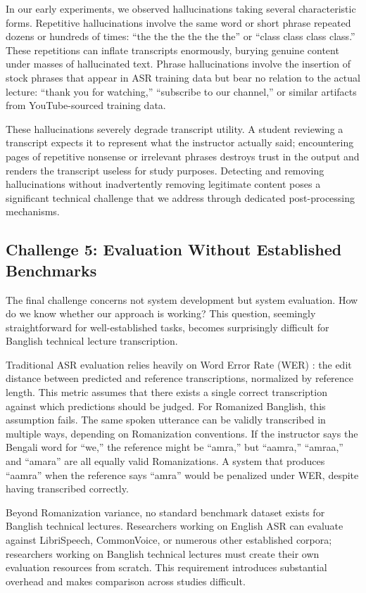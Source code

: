 In our early experiments, we observed hallucinations taking several characteristic forms. Repetitive hallucinations involve the same word or short phrase repeated dozens or hundreds of times: ``the the the the the the'' or ``class class class class.'' These repetitions can inflate transcripts enormously, burying genuine content under masses of hallucinated text. Phrase hallucinations involve the insertion of stock phrases that appear in ASR training data but bear no relation to the actual lecture: ``thank you for watching,'' ``subscribe to our channel,'' or similar artifacts from YouTube-sourced training data.

These hallucinations severely degrade transcript utility. A student reviewing a transcript expects it to represent what the instructor actually said; encountering pages of repetitive nonsense or irrelevant phrases destroys trust in the output and renders the transcript useless for study purposes. Detecting and removing hallucinations without inadvertently removing legitimate content poses a significant technical challenge that we address through dedicated post-processing mechanisms.

\subsection{Challenge 5: Evaluation Without Established Benchmarks}

The final challenge concerns not system development but system evaluation. How do we know whether our approach is working? This question, seemingly straightforward for well-established tasks, becomes surprisingly difficult for Banglish technical lecture transcription.

Traditional ASR evaluation relies heavily on Word Error Rate (WER) \cite{Jurafsky2000}: the edit distance between predicted and reference transcriptions, normalized by reference length. This metric assumes that there exists a single correct transcription against which predictions should be judged. For Romanized Banglish, this assumption fails. The same spoken utterance can be validly transcribed in multiple ways, depending on Romanization conventions. If the instructor says the Bengali word for ``we,'' the reference might be ``amra,'' but ``aamra,'' ``amraa,'' and ``amara'' are all equally valid Romanizations. A system that produces ``aamra'' when the reference says ``amra'' would be penalized under WER, despite having transcribed correctly.

Beyond Romanization variance, no standard benchmark dataset exists for Banglish technical lectures. Researchers working on English ASR can evaluate against LibriSpeech, CommonVoice, or numerous other established corpora; researchers working on Banglish technical lectures must create their own evaluation resources from scratch. This requirement introduces substantial overhead and makes comparison across studies difficult.

